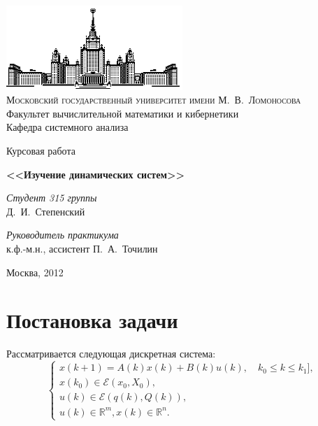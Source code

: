 \documentclass[10pt, a4paper]{article}
\renewcommand{\ell}{\mathcal{E}}
\begin{document}
\thispagestyle{empty}

\begin{center}
\ \vspace{-3cm}

\includegraphics[width=0.5\textwidth]{msu.eps}\\
{\scshape Московский государственный университет имени М.~В.~Ломоносова}\\
Факультет вычислительной математики и кибернетики\\
Кафедра системного анализа

\vfill
{\LARGE Курсовая работа}

\vspace{1cm}

{\Huge\bfseries <<Изучение динамических систем>>}
\end{center}

\vspace{2cm}

\begin{flushright}
  \large
  \textit{Студент 315 группы}\\
  Д.~И.~Степенский

  \vspace{5mm}

  \textit{Руководитель практикума}\\
  к.ф.-м.н., ассистент П.~А.~Точилин
\end{flushright}

\vfill

\begin{center}
Москва, 2012
\end{center}

\newpage

\tableofcontents

\newpage

\section{Постановка задачи}
Рассматривается следующая дискретная система:
\begin{equation}\label{statement_system} \begin{cases}
{x}(k+1) = A(k)x(k)+B(k)u(k),\quad k_0\leqslant k\leqslant k_1],\\
x(k_0)\in \ell(x_0,X_0), \\
u(k) \in \ell(q(k),Q(k)),\\
u(k)\in \mathbb{R}^m, x(k)\in \mathbb{R}^n.
\end{cases} \end{equation}  
\end{document}
